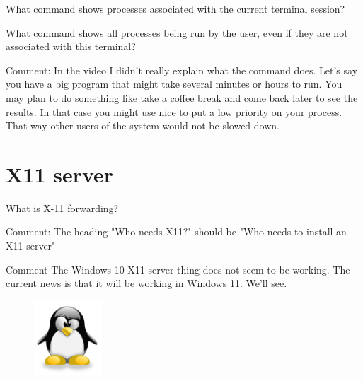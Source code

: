 \documentclass[letterpaper,12pt]{exam}
\begin{document}
\begin {questions}
\question What command shows processes associated with the current terminal session?
\vspace{5mm}

\question What command shows all processes being run by the user, even if they are not associated with this terminal?
\vspace{5mm}

\noindent Comment:  In the video I didn't really explain what the  command does.  Let's say you have a big program that might take several minutes or hours to run.  You may plan to do something like take a coffee break and come back later to see the results.  In that case you might use nice to put a low priority on your process.  That way other users of the system would not be slowed down.

\section*{X11 server}

\begin{samepage}
\question What is X-11 forwarding? 
\vspace{5mm}
\end{samepage}
\noindent Comment:  The heading "Who needs X11?" should be "Who needs to install an X11 server"

\noindent Comment The Windows 10 X11 server thing does not seem to be working.  The current news is that it will be working in Windows 11.  We'll see.







\end{questions}
\noindent 

\begin{figure}[b]\label{end}
	\center
	\includegraphics[width=1in]{tux}
\end{figure}
\end{document}
